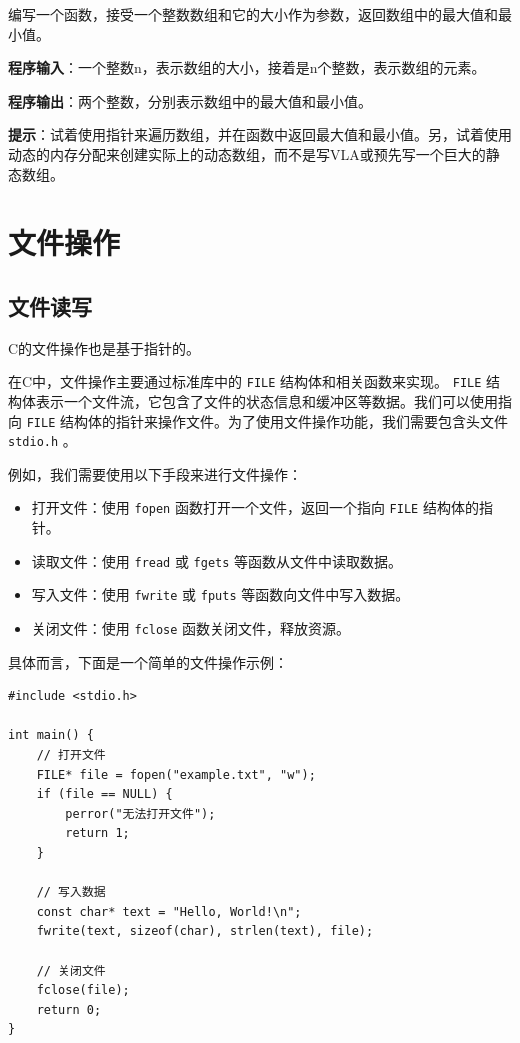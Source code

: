 \begin{exercise}[指针练习题]
编写一个函数，接受一个整数数组和它的大小作为参数，返回数组中的最大值和最小值。

\textbf{程序输入}：一个整数n，表示数组的大小，接着是n个整数，表示数组的元素。

\textbf{程序输出}：两个整数，分别表示数组中的最大值和最小值。

\textbf{提示}：试着使用指针来遍历数组，并在函数中返回最大值和最小值。另，试着使用动态的内存分配来创建实际上的动态数组，而不是写VLA或预先写一个巨大的静态数组。

\end{exercise}

\section{文件操作}

\subsection{文件读写}

C的文件操作也是基于指针的。

在C中，文件操作主要通过标准库中的 \texttt{FILE} 结构体和相关函数来实现。 \texttt{FILE} 结构体表示一个文件流，它包含了文件的状态信息和缓冲区等数据。我们可以使用指向 \texttt{FILE} 结构体的指针来操作文件。为了使用文件操作功能，我们需要包含头文件 \texttt{stdio.h} 。

例如，我们需要使用以下手段来进行文件操作：
\begin{itemize}
    \item 打开文件：使用 \texttt{fopen} 函数打开一个文件，返回一个指向 \texttt{FILE} 结构体的指针。
    \item 读取文件：使用 \texttt{fread} 或 \texttt{fgets} 等函数从文件中读取数据。
    \item 写入文件：使用 \texttt{fwrite} 或 \texttt{fputs} 等函数向文件中写入数据。
    \item 关闭文件：使用 \texttt{fclose} 函数关闭文件，释放资源。
\end{itemize}

具体而言，下面是一个简单的文件操作示例：
\begin{verbatim}
#include <stdio.h>  

int main() {
    // 打开文件
    FILE* file = fopen("example.txt", "w");
    if (file == NULL) {
        perror("无法打开文件");
        return 1;
    }

    // 写入数据
    const char* text = "Hello, World!\n";
    fwrite(text, sizeof(char), strlen(text), file);

    // 关闭文件
    fclose(file);
    return 0;
}
\end{verbatim}

